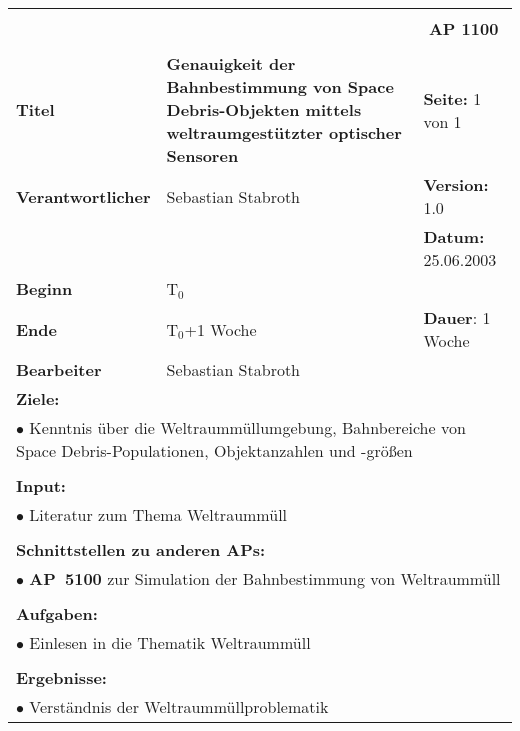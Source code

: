 \begin{table}[!h]
 \begin{center}
  \begin{tabular}{|p{35mm}||p{55mm}|p{50mm}||p{40mm}|}
   \hline
   \multicolumn{3}{|l||}{\textbf{}} & \multicolumn{1}{c|}{}\\
   \multicolumn{3}{|l||}{\textbf{}} & \multicolumn{1}{c|}{\textbf{AP 1100}}\\
   \multicolumn{3}{|l||}{\textbf{}} & \multicolumn{1}{c|}{}\\
   \hline\hline
   \textbf{Titel} & \multicolumn{2}{p{7cm}||}{\textbf{Genauigkeit der Bahnbestimmung von Space Debris-Objekten mittels weltraumgestützter optischer Sensoren}} 
& \textbf{Seite:} 1 von 1\\
   \hline
   \textbf{Verantwortlicher} & \multicolumn{2}{l||}{Sebastian Stabroth} & \textbf{Version:} 1.0\\
   \hline
   \multicolumn{3}{|l||}{} & \textbf{Datum:} 25.06.2003\\
   \hline\hline
   \textbf{Beginn} & \multicolumn{2}{l||}{T$_0$} & \\
   \hline
   \textbf{Ende} & \multicolumn{2}{l||}{T$_0$+1 Woche} & \textbf{Dauer}: 1 Woche\\
   \hline\hline
   \textbf{Bearbeiter} & \multicolumn{3}{l|}{Sebastian Stabroth}\\
   \hline\hline
   \multicolumn{4}{|p{150mm}|}{\textbf{Ziele:}}\\
   \multicolumn{4}{|p{150mm}|}{$\bullet$ Kenntnis über die Weltraummüllumgebung, Bahnbereiche von Space Debris-Populationen, Objektanzahlen und -größen}\\
   \multicolumn{4}{|p{150mm}|}{}\\
   \multicolumn{4}{|p{150mm}|}{\textbf{Input:}}\\
   \multicolumn{4}{|p{150mm}|}{$\bullet$ Literatur zum Thema Weltraummüll}\\
   \multicolumn{4}{|p{150mm}|}{}\\
   \multicolumn{4}{|p{150mm}|}{\textbf{Schnittstellen zu anderen APs:}}\\
   \multicolumn{4}{|p{150mm}|}{$\bullet$ \textbf{AP~5100} zur Simulation der Bahnbestimmung von Weltraummüll}\\
   \multicolumn{4}{|p{150mm}|}{}\\
   \multicolumn{4}{|p{150mm}|}{\textbf{Aufgaben:}}\\
   \multicolumn{4}{|p{150mm}|}{$\bullet$ Einlesen in die Thematik Weltraummüll}\\
   \multicolumn{4}{|p{150mm}|}{}\\
   \multicolumn{4}{|p{150mm}|}{\textbf{Ergebnisse:}}\\
   \multicolumn{4}{|p{150mm}|}{$\bullet$ Verständnis der Weltraummüllproblematik}\\
   \hline
  \end{tabular}
 \end{center}
\end{table}

